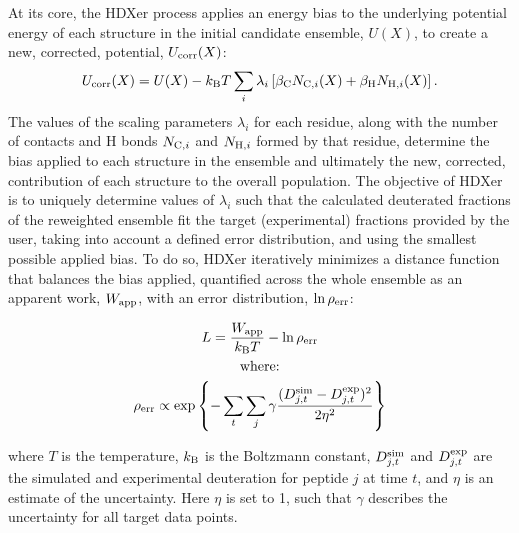 \documentclass[9pt,tutorial,ASAPversion]{livecoms}
\begin{document}
At its core, the HDXer process applies an energy bias to the underlying potential energy of each structure in the initial candidate ensemble, $U(X)$, to create a new, corrected, potential, $U_{\textnormal{corr}}(X)$:
\begin{equation}\label{Ucorr_eqn}
    U_{\textnormal{corr}}(X) = U(X) -k_\textnormal{B}T\sum_{i} \lambda_i \left[ \beta_\textnormal{C} N_{\textnormal{C},i}(X) + \beta_\textnormal{H} N_{\textnormal{H},i}(X) \right].
\end{equation}
The values of the scaling parameters $\lambda_i$ for each residue, along with the number of contacts and H bonds $N_{\textnormal{C},i}$ and $N_{\textnormal{H},i}$ formed by that residue, determine the bias applied to each structure in the ensemble and ultimately the new, corrected, contribution of each structure to the overall population.
The objective of HDXer is to uniquely determine values of $\lambda_i$ such that the calculated deuterated fractions of the reweighted ensemble fit the target (experimental) fractions provided by the user, taking into account a defined error distribution, and using the smallest possible applied bias.
To do so, HDXer iteratively minimizes a distance function that balances the bias applied, quantified across the whole ensemble as an apparent work, $W_\textnormal{app}$, with an error distribution, $\ln{\rho_\textnormal{err}}$:

\begin{equation}\label{KL_eqn}
\begin{gathered}
L = \frac{W_\textnormal{app}}{k_\textnormal{B}T} - \ln{\rho_\textnormal{err}} \\
\textnormal{where:} \\
\rho_\textnormal{err} \propto \exp{ \left\{ - \sum_t \sum_j \gamma \frac{(D_{j,t}^\textnormal{sim} - D_{j,t}^\textnormal{exp})^2}{2\eta^2} \right\} }  
\end{gathered}
\end{equation}

where $T$ is the temperature, $k_\textnormal{B}$ is the Boltzmann constant, $D_{j,t}^\textnormal{sim}$ and $D_{j,t}^\textnormal{exp}$ are the simulated and experimental deuteration for peptide $j$ at time $t$, and $\eta$ is an estimate of the uncertainty.
Here $\eta$ is set to 1, such that $\gamma$ describes the uncertainty for all target data points.
\end{document}

